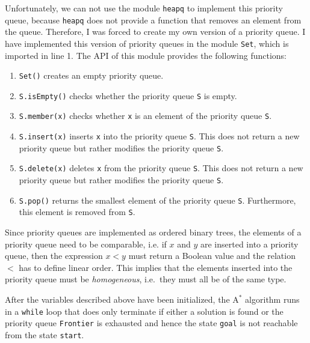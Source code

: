 \begin{enumerate}
      Unfortunately, we can not use the module \texttt{heapq} to implement this priority queue,
      because \texttt{heapq} does not provide a function that removes an element from the queue.
      Therefore, I was forced to create my own version of a priority queue.  I have implemented 
      this version of priority queues in the module \texttt{Set}, which is imported in line 1.
      The API of this module provides the following functions:
      \begin{enumerate}
      \item \texttt{Set()} creates an empty priority queue.
      \item \texttt{S.isEmpty()} checks whether the priority queue \texttt{S} is empty.
      \item \texttt{S.member(x)} checks whether \texttt{x} is an element of the priority queue \texttt{S}.
      \item \texttt{S.insert(x)} inserts \texttt{x} into the priority queue \texttt{S}.
            This does not return a new priority queue but rather modifies the priority queue \texttt{S}.
      \item \texttt{S.delete(x)} deletes \texttt{x} from the priority queue \texttt{S}.
            This does not return a new priority queue but rather modifies the priority queue \texttt{S}.
      \item \texttt{S.pop()} returns the smallest element of the priority queue \texttt{S}.
            Furthermore, this element is removed from \texttt{S}.
      \end{enumerate}
      Since priority queues are implemented as ordered binary trees, the elements of a priority queue need to
      be comparable, i.e. if $x$ and $y$ are inserted into a priority queue, then the  
      expression $x < y$ must return a Boolean value and the relation $<$ has to define 
      linear order.  This implies that the elements inserted into the priority queue must be
      \emph{homogeneous}, i.e.~they must all be of the same type.
\end{enumerate}
After the variables described above have been initialized, the $\mathrm{A}^*$ algorithm runs in a
\texttt{while} loop that does only terminate if either a solution is found or the priority queue
\texttt{Frontier} is exhausted and hence the state \texttt{goal} is not reachable from the state \texttt{start}. 
